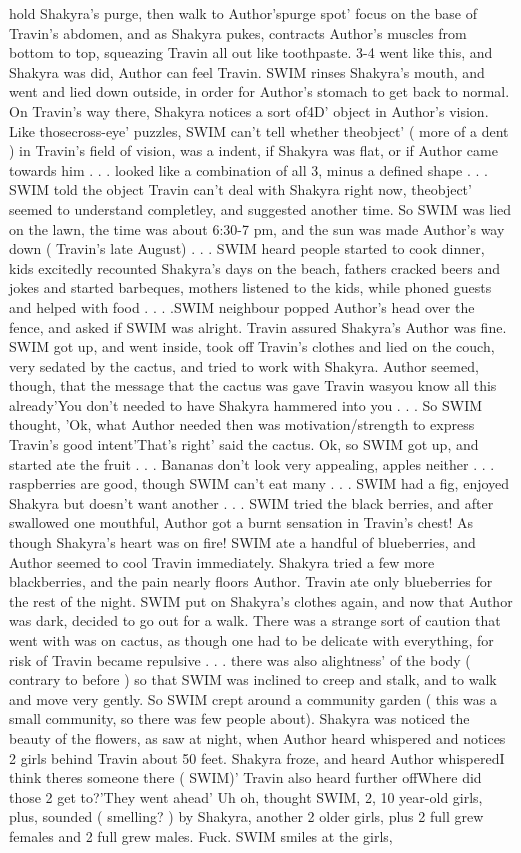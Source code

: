 \documentclass[12pt]{book}
\begin{document}
hold Shakyra's purge, then walk to Author'spurge spot' focus on the base of Travin's abdomen, and as Shakyra pukes, contracts Author's muscles from bottom to top, squeazing Travin all out like toothpaste. 3-4 went like this, and Shakyra was did, Author can feel Travin. SWIM rinses Shakyra's mouth, and went and lied down outside, in order for Author's stomach to get back to normal. On Travin's way there, Shakyra notices a sort of4D' object in Author's vision. Like thosecross-eye' puzzles, SWIM can't tell whether theobject' ( more of a dent ) in Travin's field of vision, was a indent, if Shakyra was flat, or if Author came towards him . . .  looked like a combination of all 3, minus a defined shape . . .  SWIM told the object Travin can't deal with Shakyra right now, theobject' seemed to understand completley, and suggested another time. So SWIM was lied on the lawn, the time was about 6:30-7 pm, and the sun was made Author's way down ( Travin's late August) . . .  SWIM heard people started to cook dinner, kids excitedly recounted Shakyra's days on the beach, fathers cracked beers and jokes and started barbeques, mothers listened to the kids, while phoned guests and helped with food . . .  .SWIM neighbour popped Author's head over the fence, and asked if SWIM was alright. Travin assured Shakyra's Author was fine. SWIM got up, and went inside, took off Travin's clothes and lied on the couch, very sedated by the cactus, and tried to work with Shakyra. Author seemed, though, that the message that the cactus was gave Travin wasyou know all this already'You don't needed to have Shakyra hammered into you . . .  So SWIM thought, 'Ok, what Author needed then was motivation/strength to express Travin's good intent'That's right' said the cactus. Ok, so SWIM got up, and started ate the fruit . . .  Bananas don't look very appealing, apples neither . . .  raspberries are good, though SWIM can't eat many . . .  SWIM had a fig, enjoyed Shakyra but doesn't want another . . .  SWIM tried the black berries, and after swallowed one mouthful, Author got a burnt sensation in Travin's chest! As though Shakyra's heart was on fire! SWIM ate a handful of blueberries, and Author seemed to cool Travin immediately. Shakyra tried a few more blackberries, and the pain nearly floors Author. Travin ate only blueberries for the rest of the night. SWIM put on Shakyra's clothes again, and now that Author was dark, decided to go out for a walk. There was a strange sort of caution that went with was on cactus, as though one had to be delicate with everything, for risk of Travin became repulsive . . .  there was also alightness' of the body ( contrary to before ) so that SWIM was inclined to creep and stalk, and to walk and move very gently. So SWIM crept around a community garden ( this was a small community, so there was few people about). Shakyra was noticed the beauty of the flowers, as saw at night, when Author heard whispered and notices 2 girls behind Travin about 50 feet. Shakyra froze, and heard Author whisperedI think theres someone there ( SWIM)' Travin also heard further offWhere did those 2 get to?'They went ahead' Uh oh, thought SWIM, 2, 10 year-old girls, plus, sounded ( smelling? ) by Shakyra, another 2 older girls, plus 2 full grew females and 2 full grew males. Fuck. SWIM smiles at the girls, 
\end{document}

